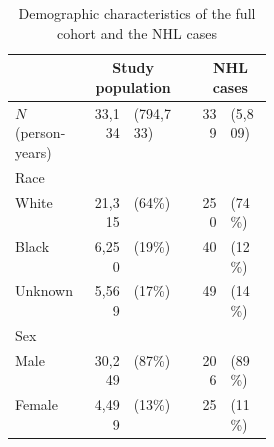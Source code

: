 \documentclass[20pt,final]{beamer}
\newlength{\onecolwid}
\begin{document}
\begin{frame}[t]
\begin{columns}[t,totalwidth=\onecolwid]
\begin{column}{\onecolwid}
{        \vspace{0.25\baselineskip}
        \begin{table}
          \caption{Demographic characteristics of the full cohort and the NHL cases}
          \small
          \begin{tabular}{p{0.3\linewidth}rlcrl}
            \toprule
                                & \multicolumn{2}{c}{Study population\phantom{0000}} &
                                & \multicolumn{2}{c}{NHL cases\phantom{00000}}                                                 \\
            \midrule
            $N$ (person-years)  & 33,134                                             & (794,733)     &  & 339  & (5,809)       \\
            Race                                                                                                               \\
            \hspace{1em}White   & 21,315                                             & (64\%)        &  & 250  & (74\%)        \\
            \hspace{1em}Black   & 6,250                                              & (19\%)        &  & 40   & (12\%)        \\
            \hspace{1em}Unknown & 5,569                                              & (17\%)        &  & 49   & (14\%)        \\
            Sex                                                                                                                \\
            \hspace{1em}Male    & 30,249                                             & (87\%)        &  & 206  & (89\%)        \\
            \hspace{1em}Female  & 4,499                                              & (13\%)        &  & 25   & (11\%)        \\

\end{tabular}
\end{table}}
\end{column}
\end{columns}
\end{frame}
\end{document}
